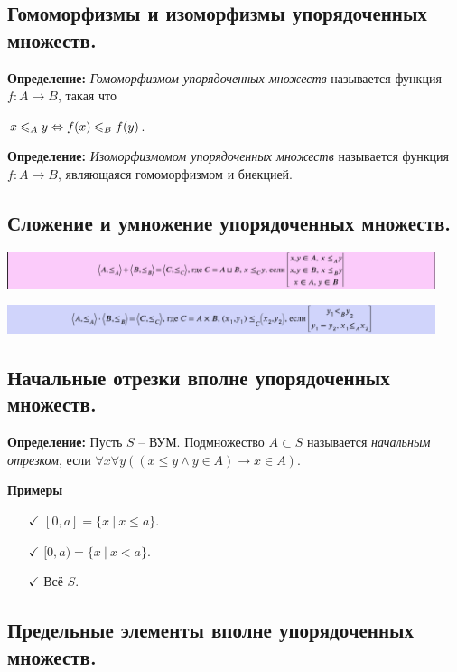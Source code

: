 \subsection{Гомоморфизмы и изоморфизмы упорядоченных множеств.}

\textbf{Определение:} \textit{Гомоморфизмом упорядоченных множеств} называется функция $f:A\rightarrow B$, такая что
\begin{center}
    $x \leqslant_A y \Leftrightarrow f(x) \leqslant_B f(y)$.
\end{center}

\textbf{Определение:} \textit{Изоморфизмомом  упорядоченных множеств} называется  функция $f:A\rightarrow B$, являющаяся гомоморфизмом и биекцией.

\subsection{Сложение и умножение упорядоченных множеств.}

\includegraphics[width = 0.94\textwidth]{images/2 (определения)_m24.PNG}

\includegraphics[width = 0.94\textwidth]{images/2 (определения)_m25.PNG}

\subsection{Начальные отрезки вполне упорядоченных множеств.}
\textbf{Определение:} Пусть $S$ -- ВУМ. Подмножество $A \subset S$ называется \textit{начальным отрезком}, если $\forall x \forall y \left((x \leq y \land y \in A) \to x \in A \right)$.

\textbf{Примеры}
\begin{itemize}
    \item [$\checkmark$] $[0,a] = \{x \ | \ x\leq a\}$.
    \item [$\checkmark$] $[0,a) = \{x \ | \ x<a\}$.
    \item [$\checkmark$] Всё $S$.
\end{itemize}

\subsection{Предельные элементы вполне упорядоченных множеств.}

